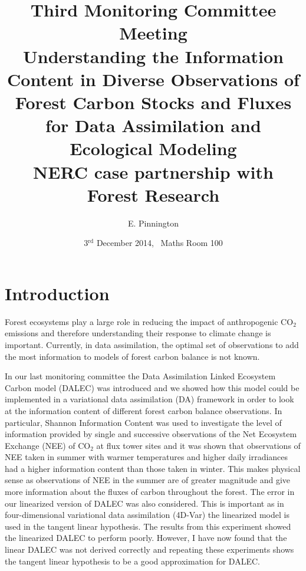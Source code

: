 \documentclass[11pt]{article}
\title{Third Monitoring Committee Meeting\\\vspace{4mm} \normalsize{Understanding the Information Content in Diverse Observations of Forest Carbon Stocks and Fluxes for Data Assimilation and Ecological Modeling\\ NERC case partnership with Forest Research}}
\date{\normalsize{3$^{\text{rd}}$ December 2014, \ Maths Room 100}}
\author{\normalsize{E. Pinnington}}
\begin{document}
\maketitle

\section{Introduction}

Forest ecosystems play a large role in reducing the impact of anthropogenic CO$_2$ emissions and therefore understanding their response to climate change is important. Currently, in data assimilation, the optimal set of observations to add the most information to models of forest carbon balance is not known.  

In our last monitoring committee the Data Assimilation Linked Ecosystem Carbon model (DALEC) \cite{williams2005improved} was introduced and we showed how this model could be implemented in a variational data assimilation (DA) framework in order to look at the information content of different forest carbon balance observations. In particular, Shannon Information Content \cite{rodgers2000inverse} was used to investigate the level of information provided by single and successive observations of the Net Ecosystem Exchange (NEE) of CO$_2$ at flux tower sites and it was shown that observations of NEE taken in summer with warmer temperatures and higher daily irradiances had a higher information content than those taken in winter. This makes physical sense as observations of NEE in the summer are of greater magnitude and give more information about the fluxes of carbon throughout the forest. The error in our linearized version of DALEC was also considered. This is important as in four-dimensional variational data assimilation (4D-Var) the linearized model is used in the tangent linear hypothesis. The results from this experiment showed the linearized DALEC to perform poorly. However, I have now found that the linear DALEC was not derived correctly and repeating these experiments shows the tangent linear hypothesis to be a good approximation for DALEC. 
\end{document}
